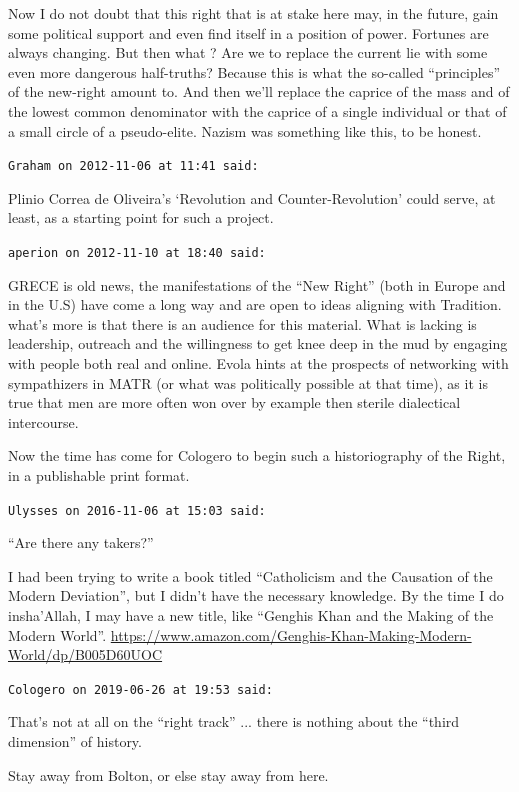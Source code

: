 \begin{footnotesize}
\begin{sffamily}
Now I do not doubt that this right that is at stake here may, in the future, gain some political support and even find itself in a position of power. Fortunes are always changing. But then what ? Are we to replace the current lie with some even more dangerous half-truths? Because this is what the so-called ``principles'' of the new-right amount to. And then we'll replace the caprice of the mass and of the lowest common denominator with the caprice of a single individual or that of a small circle of a pseudo-elite. Nazism was something like this, to be honest.

\hfill

\texttt{Graham on 2012-11-06 at 11:41 said:}

Plinio Correa de Oliveira's `Revolution and Counter-Revolution' could serve, at least, as a starting point for such a project.

\hfill

\texttt{aperion on 2012-11-10 at 18:40 said:}

GRECE is old news, the manifestations of the ``New Right'' (both in Europe and in the U.S) have come a long way and are open to ideas aligning with Tradition. what's more is that there is an audience for this material. What is lacking is leadership, outreach and the willingness to get knee deep in the mud by engaging with people both real and online. Evola hints at the prospects of networking with sympathizers in MATR (or what was politically possible at that time), as it is true that men are more often won over by example then sterile dialectical intercourse.

Now the time has come for Cologero to begin such a historiography of the Right, in a publishable print format.

\hfill

\texttt{Ulysses on 2016-11-06 at 15:03 said:}

``Are there any takers?''

I had been trying to write a book titled ``Catholicism and the Causation of the Modern Deviation'', but I didn't have the necessary knowledge. By the time I do insha'Allah, I may have a new title, like ``Genghis Khan and the Making of the Modern World''.
\url{https://www.amazon.com/Genghis-Khan-Making-Modern-World/dp/B005D60UOC}


\hfill

\texttt{Cologero on 2019-06-26 at 19:53 said:}

That's not at all on the ``right track'' ... there is nothing about the ``third dimension'' of history.

Stay away from Bolton, or else stay away from here.


\hfill

\end{sffamily}
\end{footnotesize}


